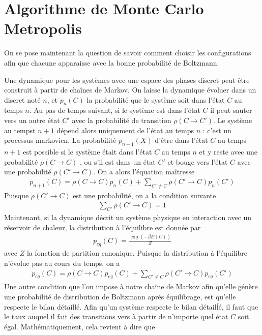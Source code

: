     \section{Algorithme de Monte Carlo Metropolis}

On se pose maintenant la question de savoir comment choisir les configurations afin que chacune apparaisse avec la bonne probabilité de Boltzmann. 

Une dynamique pour les systèmes avec une espace des phases discret peut être construit à partir de chaînes de Markov. On laisse la dynamique évoluer dans un discret noté $n$, et $p_n(C)$ la probabilité que le système soit dans l'état $C$ au temps $n$. Au pas de temps suivant, si le système est dans l'état $C$ il peut sauter vers un autre état $C'$ avec la probabilité de transition $\rho(C\to C')$. Le système au tempst $n+1$ dépend alors uniquement de l'état au temps $n$ : c'est un processus markovien. La probabilité $p_{n+1}(X)$ d'être dans l'état $C$ au temps $n+1$ est possible si le système était dans l'état $C$ au temps $n$ et y reste avec une probabilité $\rho(C\to C)$ , ou s'il est dans un état $C'$ et bouge vers l'état $C$ avec une probabilité $\rho(C'\to C)$. On a alors l'équation maîtresse
\begin{align}
    p_{n+1}(C) =  \rho(C\to C) p_n(C) + \sum_{C'\neq C} \rho(C'\to C) p_n(C')
\end{align}
Puisque $\rho(C' \to C)$ est une probabilité, on a la condition suivante
\begin{align}
    \sum_{C'} \rho(C' \to C) = 1
    \label{norm}
\end{align}
Maintenant, si la dynamique décrit un système physique en interaction avec un  réservoir de chaleur, la distribution à l'équilibre est donnée par
\begin{align}
    p_{eq}(C) = \frac{\exp(-\beta E(C))}{Z}
\end{align}
avec $Z$ la fonction de partition canonique. Puisque la distribution à l'équilibre n'évolue pas au cours du temps, on a
\begin{align}
    p_{eq}(C) =  \rho(C\to C) p_{eq}(C) + \sum_{C'\neq C} \rho(C'\to C)p_{eq}(C')
    \label{p-eq-mc}
\end{align}
Une autre condition que l'on impose à notre chaîne de Markov afin qu'elle génère une probabilité de distribution de Boltzmann après équilibrage, est qu'elle respecte le bilan détaillé. Afin qu'un système respecte le bilan détailĺé, il faut que le taux auquel il fait des transitions vers à partir de n'importe quel état $C$ soit égal. Mathématiquement, cela revient à dire que
